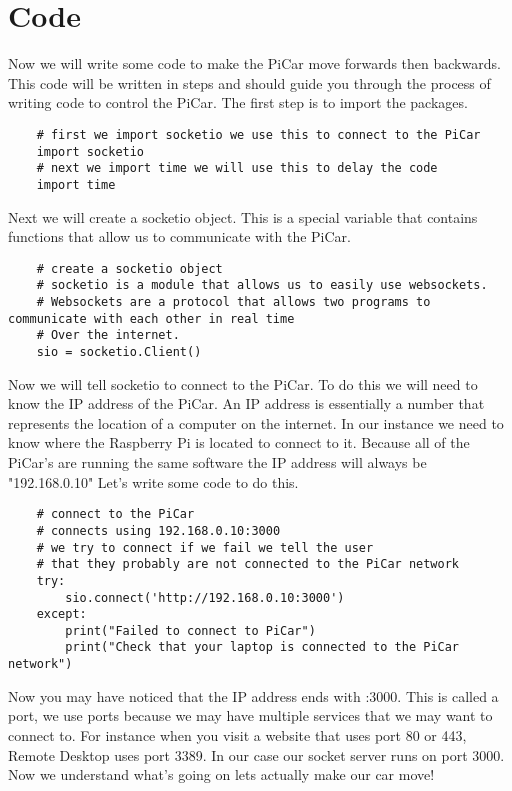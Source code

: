 \documentclass[11pt]{report}
\begin{document}
    \section{Code}
    Now we will write some code to make the PiCar move forwards then backwards. 
    This code will be written in steps and should guide you through the process of writing code to control the PiCar. The first step is to import the packages.
    \begin{verbatim}
    # first we import socketio we use this to connect to the PiCar
    import socketio 
    # next we import time we will use this to delay the code
    import time
    \end{verbatim}

    Next we will create a socketio object. This is a special variable that contains functions that allow us to communicate with the PiCar.

    \begin{verbatim}
    # create a socketio object
    # socketio is a module that allows us to easily use websockets.
    # Websockets are a protocol that allows two programs to communicate with each other in real time
    # Over the internet. 
    sio = socketio.Client()
    \end{verbatim}

    Now we will tell socketio to connect to the PiCar. To do this we will need to know the IP address of the PiCar. An IP address is essentially a number that represents the location of a computer on the internet. In our instance we need to know where the Raspberry Pi is located to connect to it. Because all of the PiCar's are running the same software the IP address will always be "192.168.0.10" Let's write some code to do this.

    \begin{verbatim}
    # connect to the PiCar
    # connects using 192.168.0.10:3000
    # we try to connect if we fail we tell the user 
    # that they probably are not connected to the PiCar network
    try:
        sio.connect('http://192.168.0.10:3000')
    except:
        print("Failed to connect to PiCar")
        print("Check that your laptop is connected to the PiCar network")
    \end{verbatim}

    Now you may have noticed that the IP address ends with :3000. This is called a port, we use ports because we may have multiple services that we may want to connect to. For instance when you visit a website that uses port 80 or 443, Remote Desktop uses port 3389. In our case our socket server runs on port 3000. Now we understand what's going on lets actually make our car move!
\end{document}
